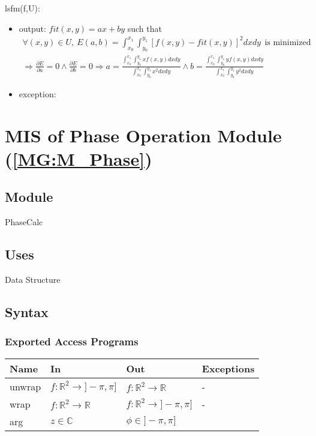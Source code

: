 \documentclass[12pt, titlepage]{article}
\begin{document}
\noindent lsfm(f,U):
\begin{itemize}
\item output: $fit(x,y)=ax + by$ such that
\begin{equation*}
\begin{gathered}
\forall (x,y) \in U, \ E(a,b)=\int_{x_0}^{x_1}\int_{y_0}^{y_1}[f(x,y)-fit(x,y)]^2dxdy \ \ \text{is minimized} \\
\Rightarrow \frac{\partial E}{\partial a} =0 \wedge \frac{\partial E}{\partial b} =0
\Rightarrow a = \frac{\int_{x_0}^{x_1}\int_{y_0}^{y_1}xf(x,y)dxdy}{\int_{x_0}^{x_1}\int_{y_0}^{y_1}x^2dxdy} \wedge  b= \frac{\int_{x_0}^{x_1}\int_{y_0}^{y_1}yf(x,y)dxdy}{\int_{x_0}^{x_1}\int_{y_0}^{y_1}y^2dxdy}
\end{gathered}
\end{equation*}
\item exception:  
\end{itemize}


\section{MIS of Phase Operation Module (\texorpdfstring{\cref{MG:M_Phase}}))} \label{MIS_Phase}

\subsection{Module}
PhaseCalc
\subsection{Uses}
Data Structure
\subsection{Syntax}

\subsubsection{Exported Access Programs}

\begin{center}
\begin{tabular}{p{2cm} p{4cm} p{4cm} p{2cm}}
\hline
\textbf{Name} & \textbf{In} & \textbf{Out} & \textbf{Exceptions} \\
\hline
unwrap & $f:\mathbb{R}^2\rightarrow]-\pi,\pi]$ & $f:\mathbb{R}^2\rightarrow\mathbb{R}$ & - \\
wrap & $f:\mathbb{R}^2\rightarrow\mathbb{R}$ & $f:\mathbb{R}^2\rightarrow]-\pi,\pi]$ & - \\
arg & $z \in \mathbb{C}$ & $\phi \in ]-\pi,\pi]$ & \\
\hline
\end{tabular}
\end{center}
\end{document}
